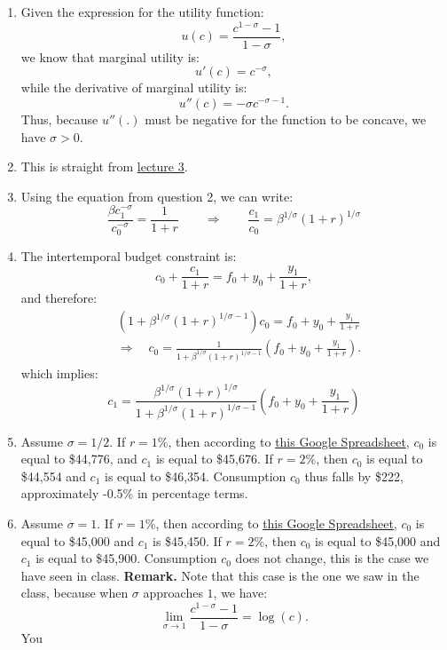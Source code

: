 \documentclass[]{book}
\theoremstyle{definition}
\theoremstyle{definition}
\theoremstyle{definition}
\theoremstyle{remark}
\begin{document}
\begin{enumerate}
\def\labelenumi{\arabic{enumi}.}
\item
  Given the expression for the utility function:
  \[u(c) = \frac{c^{1-\sigma}-1}{1-\sigma},\] we know that marginal
  utility is: \[u'(c)=c^{-\sigma},\] while the derivative of marginal
  utility is: \[u''(c)=-\sigma c^{-\sigma-1}.\] Thus, because \(u''(.)\)
  must be negative for the function to be concave, we have \(\sigma>0\).
\item
  This is straight from \protect\hyperlink{two-period}{lecture 3}.
\item
  Using the equation from question 2, we can write:
  \[\frac{\beta c_1^{-\sigma}}{c_0^{-\sigma}}=\frac{1}{1+r} \qquad \Rightarrow \qquad \frac{c_1}{c_0}=\beta^{1/\sigma} (1+r)^{1/\sigma}\]
\item
  The intertemporal budget constraint is:
  \[c_0 + \frac{c_1}{1+r} = f_0 + y_0 + \frac{y_1}{1+r},\] and
  therefore: \[\begin{aligned}
  & \left(1 + \beta^{1/\sigma}(1+r)^{1/\sigma-1} \right)c_0 = f_0 + y_0 + \frac{y_1}{1+r} \\
  & \Rightarrow \quad c_0 = \frac{1}{1 + \beta^{1/\sigma}(1+r)^{1/\sigma-1}} \left( f_0 + y_0 + \frac{y_1}{1+r}\right).
  \end{aligned}\] which implies:
  \[c_1 = \frac{\beta^{1/\sigma}(1+r)^{1/\sigma}}{1 + \beta^{1/\sigma}(1+r)^{1/\sigma-1}} \left( f_0 + y_0 + \frac{y_1}{1+r}\right)\]
\item
  Assume \(\sigma = 1/2\). If \(r = 1\%\), then according to
  \href{https://docs.google.com/spreadsheets/d/1dDFa5YZE5170Tv36klHQ19ykK2bP9wjeR0Y1_h-kacg/edit?usp=sharing}{this
  Google Spreadsheet}, \(c_0\) is equal to \$44,776, and \(c_1\) is
  equal to \$45,676. If \(r = 2\%\), then \(c_0\) is equal to \$44,554
  and \(c_1\) is equal to \$46,354. Consumption \(c_0\) thus falls by
  \$222, approximately -0.5\% in percentage terms.
\item
  Assume \(\sigma = 1\). If \(r = 1\%\), then according to
  \href{https://docs.google.com/spreadsheets/d/1dDFa5YZE5170Tv36klHQ19ykK2bP9wjeR0Y1_h-kacg/edit?usp=sharing}{this
  Google Spreadsheet}, \(c_0\) is equal to \$45,000 and \(c_1\) is
  \$45,450. If \(r = 2\%\), then \(c_0\) is equal to \$45,000 and
  \(c_1\) is equal to \$45,900. Consumption \(c_0\) does not change,
  this is the case we have seen in class. \textbf{Remark.} Note that
  this case is the one we saw in the class, because when \(\sigma\)
  approaches \(1\), we have:
  \[\lim_{\sigma \to 1} \frac{c^{1-\sigma}-1}{1-\sigma}=\log(c).\] You

\end{enumerate}
\end{document}
